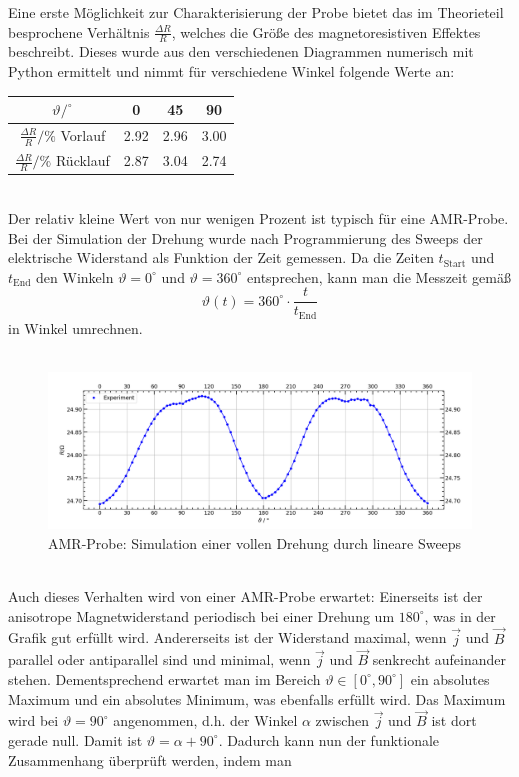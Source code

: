 \documentclass[german,  %
parskip=full,  %
]{scrartcl}
\begin{document}
\newpage  
Eine erste Möglichkeit zur Charakterisierung der Probe bietet das im Theorieteil besprochene Verhältnis \(\frac{\Delta R}{R}\), welches die Größe des magnetoresistiven Effektes beschreibt. Dieses wurde aus den verschiedenen Diagrammen numerisch mit Python ermittelt und nimmt für verschiedene Winkel folgende Werte an: \\
\begin{table}[h!]\centering
\begin{tabular}{|c|c|c|c|}
\hline
\(\vartheta / ^{\circ}\)  & 0  & 45  & 90 \\\hline
\(\frac{\Delta R}{R} / \%\) Vorlauf & 2.92 & 2.96  & 3.00 \\\hline
\(\frac{\Delta R}{R} / \%\) Rücklauf & 2.87 & 3.04  & 2.74 \\\hline
\end{tabular}
\end{table} \\
Der relativ kleine Wert von nur wenigen Prozent ist typisch für eine AMR-Probe.
Bei der Simulation der Drehung wurde nach Programmierung des Sweeps der elektrische Widerstand als Funktion der Zeit gemessen. Da die Zeiten \(t_{\mathrm{Start}}\) und \(t_{\mathrm{End}}\) den Winkeln \(\vartheta = 0^{\circ}\) und \(\vartheta = 360^{\circ}\) entsprechen, kann man die Messzeit gemäß 
\[\vartheta(t) = 360^{\circ} \cdot \frac{t}{t_{\mathrm{End}}}\]
in Winkel umrechnen. \\\\
\begin{figure}[h!]\centering
\includegraphics[width=\textwidth]{Probe1_Drehung.png}
\caption{AMR-Probe: Simulation einer vollen Drehung durch lineare Sweeps}
\end{figure}\\
Auch dieses Verhalten wird von einer AMR-Probe erwartet: Einerseits ist der anisotrope Magnetwiderstand periodisch bei einer Drehung um \(180^{\circ}\), was in der Grafik gut erfüllt wird. Andererseits ist der Widerstand maximal, wenn \(\vec{j}\) und \(\vec{B}\) parallel oder antiparallel sind und minimal, wenn \(\vec{j}\) und \(\vec{B}\) senkrecht aufeinander stehen. Dementsprechend erwartet man im Bereich \(\vartheta\in\left[0^{\circ},90^{\circ}\right]\) ein absolutes Maximum und ein absolutes Minimum, was ebenfalls erfüllt wird. Das Maximum wird bei \(\vartheta = 90^{\circ}\)  angenommen, d.h. der Winkel \(\alpha\) zwischen \(\vec{j}\) und \(\vec{B}\) ist dort gerade null. Damit ist \(\vartheta = \alpha + 90^{\circ}\). Dadurch kann nun der funktionale Zusammenhang überprüft werden, indem man
\end{document}
